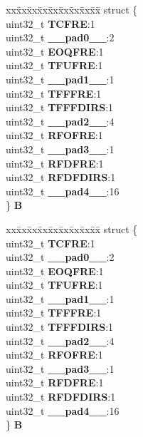 \begin{DoxyCompactItemize}
\begin{tabbing}
\end{tabbing}\item 
\mbox{\label{unionDSPI__tag_1_1DSPI__RSER__tag_a700105d47f0260e63b35f1d6d7fbbe67}} 
\begin{tabbing}
xx\=xx\=xx\=xx\=xx\=xx\=xx\=xx\=xx\=\kill
struct \{\\
\>uint32\_t {\bfseries TCFRE}:1\\
\>uint32\_t {\bfseries \_\_pad0\_\_}:2\\
\>uint32\_t {\bfseries EOQFRE}:1\\
\>uint32\_t {\bfseries TFUFRE}:1\\
\>uint32\_t {\bfseries \_\_pad1\_\_}:1\\
\>uint32\_t {\bfseries TFFFRE}:1\\
\>uint32\_t {\bfseries TFFFDIRS}:1\\
\>uint32\_t {\bfseries \_\_pad2\_\_}:4\\
\>uint32\_t {\bfseries RFOFRE}:1\\
\>uint32\_t {\bfseries \_\_pad3\_\_}:1\\
\>uint32\_t {\bfseries RFDFRE}:1\\
\>uint32\_t {\bfseries RFDFDIRS}:1\\
\>uint32\_t {\bfseries \_\_pad4\_\_}:16\\
\} {\bfseries B}\\

\end{tabbing}\item 
\mbox{\label{unionDSPI__tag_1_1DSPI__RSER__tag_aa57350b06db9afecc8bbad51f5dcaf5e}} 
\begin{tabbing}
xx\=xx\=xx\=xx\=xx\=xx\=xx\=xx\=xx\=\kill
struct \{\\
\>uint32\_t {\bfseries TCFRE}:1\\
\>uint32\_t {\bfseries \_\_pad0\_\_}:2\\
\>uint32\_t {\bfseries EOQFRE}:1\\
\>uint32\_t {\bfseries TFUFRE}:1\\
\>uint32\_t {\bfseries \_\_pad1\_\_}:1\\
\>uint32\_t {\bfseries TFFFRE}:1\\
\>uint32\_t {\bfseries TFFFDIRS}:1\\
\>uint32\_t {\bfseries \_\_pad2\_\_}:4\\
\>uint32\_t {\bfseries RFOFRE}:1\\
\>uint32\_t {\bfseries \_\_pad3\_\_}:1\\
\>uint32\_t {\bfseries RFDFRE}:1\\
\>uint32\_t {\bfseries RFDFDIRS}:1\\
\>uint32\_t {\bfseries \_\_pad4\_\_}:16\\
\} {\bfseries B}\\

\end{tabbing}\end{DoxyCompactItemize}


